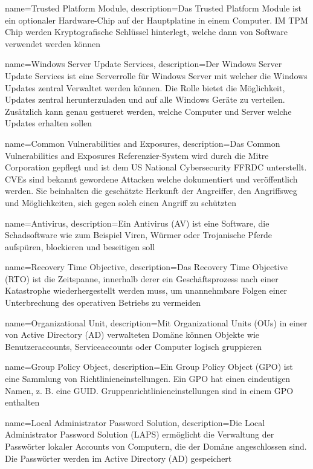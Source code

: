 {
    name=Trusted Platform Module,
    description={Das Trusted Platform Module ist ein optionaler Hardware-Chip auf der Hauptplatine in einem Computer. IM TPM Chip werden Kryptografische Schlüssel hinterlegt, welche dann von Software verwendet werden können}
}

{
    name=Windows Server Update Services,
    description={Der Windows Server Update Services ist eine Serverrolle für Windows Server mit welcher die Windows Updates zentral Verwaltet werden können. Die Rolle bietet die Möglichkeit, Updates zentral herunterzuladen und auf alle Windows Geräte zu verteilen. Zusätzlich kann genau gestueret werden, welche Computer und Server welche Updates erhalten sollen}
}

{
    name=Common Vulnerabilities and Exposures,
    description={Das Common Vulnerabilities and Exposures Referenzier-System wird durch die Mitre Corporation gepflegt und ist dem US National Cybersecurity FFRDC unterstellt. CVEs sind bekannt gewordene Attacken welche dokumentiert und veröffentlich werden. Sie beinhalten die geschätzte Herkunft der Angreiffer, den Angriffsweg und Möglichkeiten, sich gegen solch einen Angriff zu schützten}
}

{
    name=Antivirus,
    description={Ein Antivirus (AV) ist eine Software, die Schadsoftware wie zum Beispiel Viren, Würmer oder Trojanische Pferde aufspüren, blockieren und beseitigen soll}
}

{
    name=Recovery Time Objective,
    description={Das Recovery Time Objective (RTO) ist die Zeitspanne, innerhalb derer ein Geschäftsprozess nach einer Katastrophe wiederhergestellt werden muss, um unannehmbare Folgen einer Unterbrechung des operativen Betriebs zu vermeiden}
}

{
    name=Organizational Unit,
    description={Mit Organizational Units (OUs) in einer von Active Directory (AD) verwalteten Domäne können Objekte wie Benutzeraccounts, Serviceaccounts oder Computer logisch gruppieren}
}

{
    name=Group Policy Object,
    description={Ein Group Policy Object (GPO) ist eine Sammlung von Richtlinieneinstellungen. Ein GPO hat einen eindeutigen Namen, z. B. eine GUID. Gruppenrichtlinieneinstellungen sind in einem GPO enthalten}
}

{
    name=Local Administrator Password Solution,
    description={Die Local Administrator Password Solution (LAPS) ermöglicht die Verwaltung der Passwörter lokaler Accounts von Computern, die der Domäne angeschlossen sind. Die Passwörter werden im Active Directory (AD) gespeichert}
}